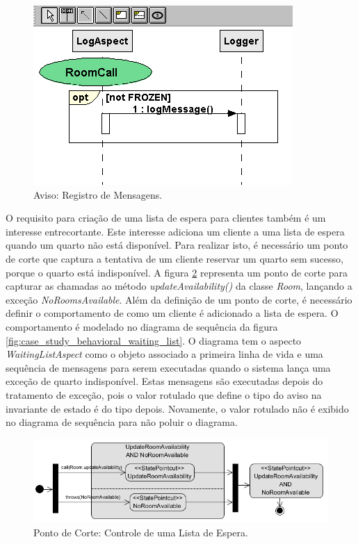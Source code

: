   \begin{figure}
	\centering
	\includegraphics{img/case_study_behavioral_log.png}
	\caption{Aviso: Registro de Mensagens.}\label{fig:case_study_behavioral_log}
  \end{figure}

O requisito para criação de uma lista de espera para clientes também é um interesse entrecortante. Este interesse adiciona um cliente a uma lista de
espera quando um quarto não está disponível. Para realizar isto, é necessário um ponto de corte que captura a tentativa de um cliente reservar um
quarto sem sucesso, porque o quarto está indisponível. A figura \ref{fig:case_study_behavioral_pointcut_waiting_list} representa um ponto de corte
para capturar as chamadas ao método \textit{updateAvailability()} da classe \textit{Room}, lançando a exceção \textit{NoRoomsAvailable}. Além da
definição de um ponto de corte, é necessário definir o comportamento de como um cliente é adicionado a lista de espera. O comportamento é modelado no
diagrama de sequência da figura \ref{fig:case_study_behavioral_waiting_list}. O diagrama tem o aspecto \textit{WaitingListAspect} como o objeto
associado a primeira linha de vida e uma sequência de mensagens para serem executadas quando o sistema lança uma exceção de quarto indisponível. Estas
mensagens são executadas depois do tratamento de exceção, pois o valor rotulado que define o tipo do aviso na invariante de estado é do tipo depois.
Novamente, o valor rotulado não é exibido no diagrama de sequência para não poluir o diagrama.

  \begin{figure}[tb]
	\centering
	\includegraphics[scale=0.8]{img/case_study_behavioral_pointcut_waiting_list.png}
	\caption{Ponto de Corte: Controle de uma Lista de Espera.}\label{fig:case_study_behavioral_pointcut_waiting_list}
  \end{figure}
  

